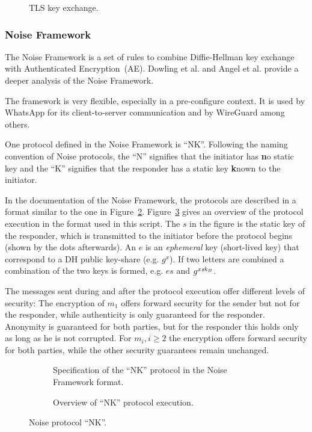 \begin{figure}[!ht]
    \centering
    
    \caption{TLS key exchange.}
    \label{fig:ake:tls}
\end{figure}

\subsubsection{Noise Framework}\label{sec:NoiseFramework}
The Noise Framework \cite{NoiseFramework} is a set of rules to combine Diffie-Hellman key exchange with Authenticated Encryption~(AE). Dowling et al. \cite{PKC:DowRosSch20} and Angel et al. \cite{CCS:ADHSW22} provide a deeper analysis of the Noise Framework.

The framework is very flexible, especially in a pre-configure context.
It is used by WhatsApp for its client-to-server communication and by WireGuard among others.

One protocol defined in the Noise Framework is ``NK''. 
Following the naming convention of Noise protocols, the ``N'' signifies that the initiator has \textbf{n}o static key and the ``K'' signifies that the responder has a static key \textbf{k}nown to the initiator.

In the documentation of the Noise Framework, the protocols are described in a format similar to the one in Figure~\ref{fig:ake:noise:nk}.
Figure~\ref{fig:ake:noise:nk_overview} gives an overview of the protocol execution in the format used in this script.
The $s$ in the figure is the static key of the responder, which is transmitted to the initiator before the protocol begins (shown by the dots afterwards).
An $e$ is an \emph{ephemeral} key (short-lived key) that correspond to a DH public key-share (e.g. $g^x$).
If two letters are combined a combination of the two keys is formed, e.g. $es$ and $g^{x\mathit{sk}_B}$.

The messages sent during and after the protocol execution offer different levels of security: 
The encryption of $m_1$ offers forward security for the sender but not for the responder, while authenticity is only guaranteed for the responder.
Anonymity is guaranteed for both parties, but for the responder this holds only as long as he is not corrupted.
For $m_i, i\geq 2$ the encryption offers forward security for both parties, while the other security guarantees remain unchanged.

\begin{figure}[!ht]
    \centering
    \begin{subfigure}{.33\textwidth}
        \centering
        
        \caption{Specification of the ``NK'' protocol in the Noise Framework format.}
        \label{fig:ake:noise:nk}
    \end{subfigure}\hfill
    \begin{subfigure}{.66\textwidth}
        \centering
        
        \caption{Overview of ``NK'' protocol execution.}
        \label{fig:ake:noise:nk_overview}
    \end{subfigure}
    \caption{Noise protocol ``NK''.}
    \label{fig:ake:noise}
\end{figure}

